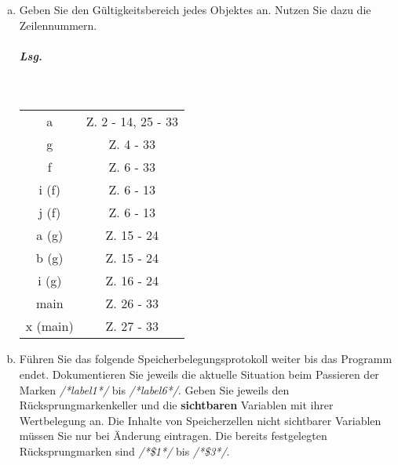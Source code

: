 \documentclass{scrreprt}
\begin{document}
\begin{enumerate}[a)]
\item Geben Sie den Gültigkeitsbereich jedes Objektes an.
  Nutzen Sie dazu die Zeilennummern.

  \subparagraph{Lsg.} \;\\
  \begin{tabular}{c|c}
    \hline
    a & Z. 2 - 14, 25 - 33 \\
    g & Z. 4 - 33 \\
    f & Z. 6 - 33 \\
    i (f) & Z. 6 - 13 \\
    j (f) & Z. 6 - 13 \\
    a (g) & Z. 15 - 24 \\
    b (g) & Z. 15 - 24 \\
    i (g) & Z. 16 - 24 \\
    main & Z. 26 - 33 \\
    x (main) & Z. 27 - 33 \\
  \end{tabular}

\item Führen Sie das folgende Speicherbelegungsprotokoll weiter bis das Programm
  endet.
  Dokumentieren Sie jeweils die aktuelle Situation beim Passieren der Marken
  \emph{/*label1*/} bis \emph{/*label6*/}.
  Geben Sie jeweils den Rücksprungmarkenkeller und die \textbf{sichtbaren}
  Variablen mit ihrer Wertbelegung an.
  Die Inhalte von Speicherzellen nicht sichtbarer Variablen müssen Sie nur bei
  Änderung eintragen.
  Die bereits festgelegten Rücksprungmarken sind \emph{/*\$1*/} bis
  \emph{/*\$3*/}.


\end{enumerate}
\end{document}
